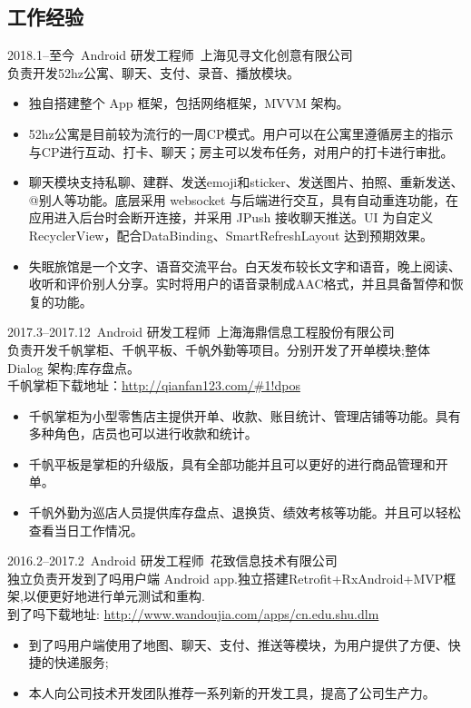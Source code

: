 \documentclass[11pt]{res}
\begin{document}
\begin{resume}
\section{工作经验}
  2018.1--至今\ Android 研发工程师\ 上海见寻文化创意有限公司\\负责开发52hz公寓、聊天、支付、录音、播放模块。
  \begin{itemize}
    \item 独自搭建整个 App 框架，包括网络框架，MVVM 架构。 
    \item 52hz公寓是目前较为流行的一周CP模式。用户可以在公寓里遵循房主的指示与CP进行互动、打卡、聊天；房主可以发布任务，对用户的打卡进行审批。
    \item 聊天模块支持私聊、建群、发送emoji和sticker、发送图片、拍照、重新发送、@别人等功能。底层采用 websocket 与后端进行交互，具有自动重连功能，在应用进入后台时会断开连接，并采用 JPush 接收聊天推送。UI 为自定义 RecyclerView，配合DataBinding、SmartRefreshLayout 达到预期效果。
    \item 失眠旅馆是一个文字、语音交流平台。白天发布较长文字和语音，晚上阅读、收听和评价别人分享。实时将用户的语音录制成AAC格式，并且具备暂停和恢复的功能。
  \end{itemize}
  2017.3--2017.12\ Android 研发工程师\ 上海海鼎信息工程股份有限公司\\负责开发千帆掌柜、千帆平板、千帆外勤等项目。分别开发了开单模块;整体 Dialog 架构;库存盘点。\\千帆掌柜下载地址：\url{http://qianfan123.com/#1!dpos}
  \begin{itemize}
    \item 千帆掌柜为小型零售店主提供开单、收款、账目统计、管理店铺等功能。具有多种角色，店员也可以进行收款和统计。
    \item 千帆平板是掌柜的升级版，具有全部功能并且可以更好的进行商品管理和开单。
    \item 千帆外勤为巡店人员提供库存盘点、退换货、绩效考核等功能。并且可以轻松查看当日工作情况。
  \end{itemize}
  2016.2--2017.2\ Android 研发工程师\ 花致信息技术有限公司\\独立负责开发到了吗用户端 Android app.独立搭建Retrofit+RxAndroid+MVP框架,以便更好地进行单元测试和重构.\\到了吗下载地址: \url{http://www.wandoujia.com/apps/cn.edu.shu.dlm}
  \begin{itemize}
    \item 到了吗用户端使用了地图、聊天、支付、推送等模块，为用户提供了方便、快捷的快递服务;
    \item 本人向公司技术开发团队推荐一系列新的开发工具，提高了公司生产力。
  \end{itemize}

\end{resume}
\end{document}
